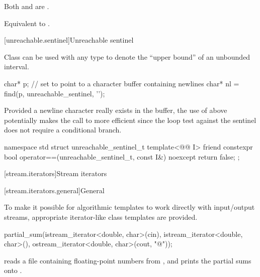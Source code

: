 \begin{itemdescr}
\pnum
\hardexpects
Both  and  are .

\pnum
\effects
Equivalent to .
\end{itemdescr}

[unreachable.sentinel]{Unreachable sentinel}

%
\pnum
Class  can be used with
any  type
to denote the ``upper bound'' of an unbounded interval.

\pnum
\begin{example}
\begin{codeblock}
char* p;
// set  to point to a character buffer containing newlines
char* nl = find(p, unreachable_sentinel, '\n');
\end{codeblock}

Provided a newline character really exists in the buffer, the use of
 above potentially makes the call to  more
efficient since the loop test against the sentinel does not require a
conditional branch.
\end{example}

%
\begin{codeblock}
namespace std {
  struct unreachable_sentinel_t {
    template<@@ I>
      friend constexpr bool operator==(unreachable_sentinel_t, const I&) noexcept
      { return false; }
  };
}
\end{codeblock}

[stream.iterators]{Stream iterators}

[stream.iterators.general]{General}

\pnum
To make it possible for algorithmic templates to work directly with input/output streams, appropriate
iterator-like
class templates
are provided.

\begin{example}
\begin{codeblock}
partial_sum(istream_iterator<double, char>(cin),
  istream_iterator<double, char>(),
  ostream_iterator<double, char>(cout, "@\textbackslash@n"));
\end{codeblock}

reads a file containing floating-point numbers from
,
and prints the partial sums onto
.
\end{example}


